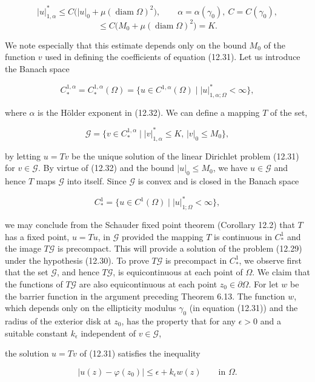 \begin{equation}
\tag{12.32}
|u|_{1,\alpha}^*\leq C\bigl(|u|_0+\mu(\operatorname{diam}\Omega)^2\bigr),\qquad \alpha=\alpha(\gamma_0),\ C=C(\gamma_0),
\end{equation}
\[
\leq C\bigl(M_0+\mu(\operatorname{diam}\Omega)^2\bigr)=K.
\]

We note especially that this estimate depends only on the bound $M_0$ of the function $v$ used in defining the coefficients of equation (12.31).
Let us introduce the Banach space

\[
C_*^{1,\alpha}=C_*^{1,\alpha}(\Omega)=\{u\in C^{1,\alpha}(\Omega)\mid |u|_{1,\alpha;\Omega}^*<\infty\},
\]

where $\alpha$ is the H\"older exponent in (12.32). We can define a mapping $T$ of the set,

\[
\mathcal{G}=\{v\in C_*^{1,\alpha}\mid |v|_{1,\alpha}^*\leq K,\, |v|_0\leq M_0\},
\]

by letting $u=Tv$ be the unique solution of the linear Dirichlet problem (12.31) for $v\in\mathcal{G}$. By virtue of (12.32) and the bound $|u|_0\leq M_0$, we have $u\in\mathcal{G}$ and hence $T$ maps $\mathcal{G}$ into itself. Since $\mathcal{G}$ is convex and is closed in the Banach space

\[
C_*^1=\{u\in C^1(\Omega)\mid |u|_{1;\Omega}^*<\infty\},
\]

we may conclude from the Schauder fixed point theorem (Corollary 12.2) that $T$ has a fixed point, $u=Tu$, in $\mathcal{G}$ provided the mapping $T$ is continuous in $C_*^1$ and the image $T\mathcal{G}$ is precompact. This will provide a solution of the problem (12.29) under the hypothesis (12.30).
To prove $T\mathcal{G}$ is precompact in $C_*^1$, we observe first that the set $\mathcal{G}$, and hence $T\mathcal{G}$, is equicontinuous at each point of $\Omega$. We claim that the functions of $T\mathcal{G}$ are also equicontinuous at each point $z_0\in\partial\Omega$. For let $w$ be the barrier function in the argument preceding Theorem 6.13. The function $w$, which depends only on the ellipticity modulus $\gamma_0$ (in equation (12.31)) and the radius of the exterior disk at $z_0$, has the property that for any $\epsilon>0$ and a suitable constant $k_\epsilon$ independent of $v\in\mathcal{G}$,



the solution $u=Tv$ of (12.31) satisfies the inequality

\begin{equation}
\tag{12.33}
|u(z)-\varphi(z_0)|\leq \epsilon+k_{\epsilon}w(z) \qquad \text{in } \Omega.
\end{equation}

